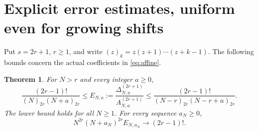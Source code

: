 \documentclass[11pt]{article}
\newtheorem{theorem}{Theorem}
\begin{document}
\section{Explicit error estimates, uniform even for growing shifts}
Put $s=2r+1$, $r\ge1$, and write $(z)_k=z(z+1)\cdots(z+k-1)$.
The following bounds concern the actual coefficients in \eqref{eq:affine}.
\begin{theorem}
For $N>r$ and every integer $a\ge0$,
\begin{equation}
 \frac{(2r-1)!}{(N)_{2r}(N+a)_{2r}}
 \le E_{N,a}:=\frac{\Delta_{N,a}^{(2r+1)}}{A_{N,a}^{(2r+1)}}
 \le\frac{(2r-1)!}{(N-r)_{2r}(N-r+a)_{2r}}.
 \label{eq:endpoint}
\end{equation}
The lower bound holds for all $N\ge1$. For every sequence $a_N\ge0$,
\begin{equation}
 N^{2r}(N+a_N)^{2r}E_{N,a_N}\longrightarrow(2r-1)!.
 \label{eq:uniformerror}
\end{equation}
\end{theorem}
\end{document}
